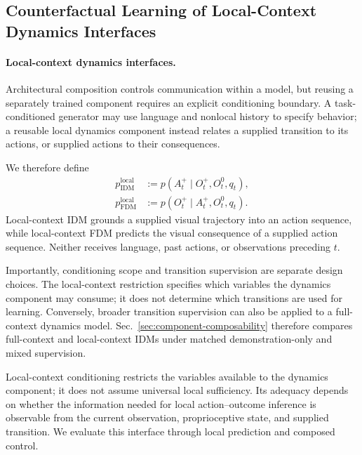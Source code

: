 \subsection{Counterfactual Learning of Local-Context Dynamics Interfaces}
\label{sec:strict-dynamics}

\paragraph{Local-context dynamics interfaces.}
Architectural composition controls communication within a model, but
reusing a separately trained component requires an explicit conditioning
boundary. A task-conditioned generator may use language and nonlocal
history to specify behavior; a reusable local dynamics component instead
relates a supplied transition to its actions, or supplied actions to their
consequences.

We therefore define
\begin{equation}
\begin{aligned}
p_{\mathrm{IDM}}^{\mathrm{local}}
&:=
p(
 A_t^+
\mid
 O_t^+, O_t^0,q_t
),\\
p_{\mathrm{FDM}}^{\mathrm{local}}
&:=
p(
 O_t^+
\mid
 A_t^+, O_t^0,q_t
).
\end{aligned}
\label{eq:strict-modeling-roles}
\end{equation}
Local-context IDM grounds a supplied visual trajectory into an action sequence,
while local-context FDM predicts the visual consequence of a supplied action
sequence. Neither receives language, past actions, or observations
preceding $t$.

Importantly, conditioning scope and transition supervision are separate
design choices. The local-context restriction specifies which variables the dynamics component
may consume; it does not determine which transitions are used for learning.
Conversely, broader transition supervision can also be applied to a
full-context dynamics model. Sec.~\ref{sec:component-composability}
therefore compares full-context and local-context IDMs under matched
demonstration-only and mixed supervision.

Local-context conditioning restricts the variables available to the dynamics
component; it does not assume universal local sufficiency. Its adequacy
depends on whether the information needed for local action--outcome inference
is observable from the current observation, proprioceptive state, and supplied
transition. We evaluate this interface through local prediction and composed
control.

